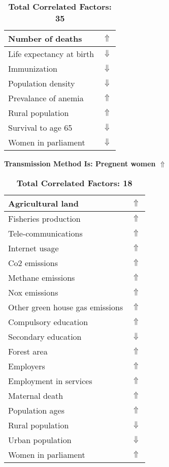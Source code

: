 \documentclass[12pt,notitlepage,oneside]{report}
\begin{document}
\begin{table}[!htb]
\begin{tabular}{|l|l|}
Number of deaths & $\Uparrow$\\ \hline
Life expectancy at birth & $\Downarrow$\\ \hline
Immunization & $\Downarrow$\\ \hline
Population density & $\Downarrow$\\ \hline
Prevalance of anemia & $\Uparrow$\\ \hline
Rural population & $\Uparrow$\\ \hline
Survival to age 65 & $\Downarrow$\\ \hline
Women in parliament & $\Downarrow$\\ \hline
\end{tabular}
\caption*{\textbf{Total Correlated Factors: 35}}
\end{table}
\clearpage
\begin{table}[!htb]
\caption{\textbf{Transmission Method Is: Pregnent women $\Uparrow$}}
\centering
\label{Correlated Socio-economic Factors0}
\begin{tabular}{|l|l|}
\hline
Agricultural land & $\Uparrow$\\ \hline
Fisheries production & $\Uparrow$\\ \hline
Tele-communications & $\Uparrow$\\ \hline
Internet usage & $\Uparrow$\\ \hline
Co2 emissions & $\Uparrow$\\ \hline
Methane emissions & $\Uparrow$\\ \hline
Nox emissions & $\Uparrow$\\ \hline
Other green house gas emissions & $\Uparrow$\\ \hline
Compulsory education & $\Uparrow$\\ \hline
Secondary education & $\Downarrow$\\ \hline
Forest area & $\Uparrow$\\ \hline
Employers & $\Uparrow$\\ \hline
Employment in services & $\Uparrow$\\ \hline
Maternal death & $\Uparrow$\\ \hline
Population ages & $\Uparrow$\\ \hline
Rural population & $\Downarrow$\\ \hline
Urban population & $\Downarrow$\\ \hline
Women in parliament & $\Uparrow$\\ \hline
\end{tabular}
\caption*{\textbf{Total Correlated Factors: 18}}
\end{table}
\end{document}
